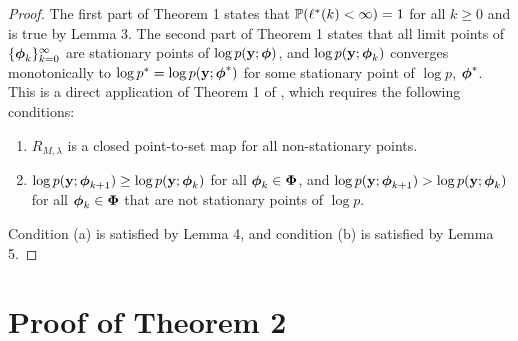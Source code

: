 \begin{proof}

The first part of Theorem 1 states that $\mathbb{P}(\ell^*(k) < \infty) = 1$ for all $k \geq 0$ and is true by Lemma 3. The second part of Theorem 1 states that all limit points of $\{\boldsymbol{\phi}_{k}\}_{k=0}^\infty$ are stationary points of $\log p(\mathbf{y};\boldsymbol{\phi})$, and $\log p(\mathbf{y};\boldsymbol{\phi}_{k})$ converges monotonically to $\log p^* = \log p(\mathbf{y};\boldsymbol{\phi}^*)$ for some stationary point of $\log p$, $\boldsymbol{\phi}^*$. This is a direct application of Theorem 1 of \citet{Wu:1983}, which requires the following conditions:

\begin{enumerate}[label=(\alph*)]
    \item $R_{M,\lambda}$ is a closed point-to-set map for all non-stationary points.
    \item $\log p(\mathbf{y};\boldsymbol{\phi}_{k+1}) \geq \log p(\mathbf{y};\boldsymbol{\phi}_k)$ for all $\boldsymbol{\phi}_k  \in \boldsymbol{\Phi}$, and $\log p(\mathbf{y};\boldsymbol{\phi}_{k+1}) > \log p(\mathbf{y};\boldsymbol{\phi}_k)$ for all $\boldsymbol{\phi}_k \in \boldsymbol{\Phi}$ that are not stationary points of $\log p$.
\end{enumerate}

Condition (a) is satisfied by Lemma 4, and condition (b) is satisfied by Lemma 5. 
%
\end{proof}

\section{Proof of Theorem 2}


